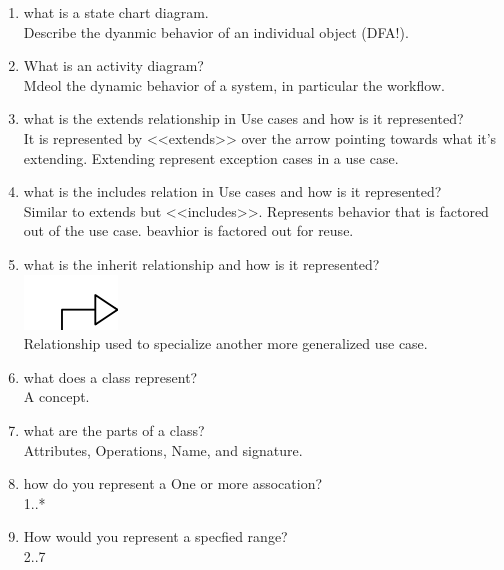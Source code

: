 \documentclass[10pt]{article}
\begin{document}
\begin{enumerate}
      \item what is a state chart diagram.\\
            Describe the dyanmic behavior of an individual object (DFA!).
      \item What is an activity diagram?\\
            Mdeol the dynamic behavior of a system, in particular the workflow.\\

      \item what is the extends relationship in Use cases and how is it represented?\\
            It is represented by <<extends>> over the arrow pointing towards what it's extending. Extending represent exception cases in a use case.\\

      \item what is the includes relation in Use cases and how is it represented?\\
            Similar to extends but <<includes>>. Represents behavior that is factored out of the use case. beavhior is factored out for reuse.\\

      \item what is the inherit relationship and how is it represented?\\
            \includegraphics*{inherit.png}\\
            Relationship used to specialize another more generalized use case.\\

      \item what does a class represent?\\
            A concept.\\

      \item what are the parts of a class?\\
            Attributes, Operations, Name, and signature.\\

      \item how do you represent a One or more assocation?\\
            1..*\\
      \item How would you represent a specfied range?\\
            2..7\\


\end{enumerate}
\end{document}
